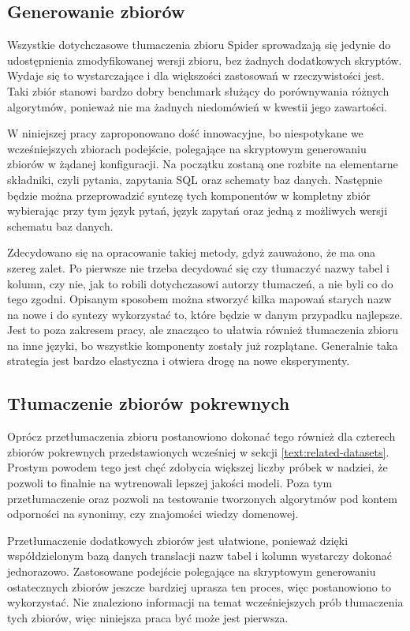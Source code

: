 \subsection{Generowanie zbiorów}
Wszystkie dotychczasowe tłumaczenia zbioru Spider sprowadzają się jedynie do udostępnienia zmodyfikowanej wersji zbioru, bez żadnych dodatkowych skryptów. Wydaje się to wystarczające i dla większości zastosowań w rzeczywistości jest. Taki zbiór stanowi bardzo dobry benchmark służący do porównywania różnych algorytmów, ponieważ nie ma żadnych niedomówień w kwestii jego zawartości.

W niniejszej pracy zaproponowano dość innowacyjne, bo niespotykane we wcześniejszych zbiorach podejście, polegające na skryptowym generowaniu zbiorów w żądanej konfiguracji. Na początku zostaną one rozbite na elementarne składniki, czyli pytania, zapytania SQL oraz schematy baz danych. Następnie będzie można przeprowadzić syntezę tych komponentów w kompletny zbiór wybierając przy tym język pytań, język zapytań oraz jedną z możliwych wersji schematu baz danych.

Zdecydowano się na opracowanie takiej metody, gdyż zauważono, że ma ona szereg zalet. Po pierwsze nie trzeba decydować się czy tłumaczyć nazwy tabel i kolumn, czy nie, jak to robili dotychczasowi autorzy tłumaczeń, a nie byli co do tego zgodni. Opisanym sposobem można stworzyć kilka mapowań starych nazw na nowe i do syntezy wykorzystać to, które będzie w danym przypadku najlepsze. Jest to poza zakresem pracy, ale znacząco to ułatwia również tłumaczenia zbioru na inne języki, bo wszystkie komponenty zostały już rozplątane. Generalnie taka strategia jest bardzo elastyczna i otwiera drogę na nowe eksperymenty.

\subsection{Tłumaczenie zbiorów pokrewnych}
Oprócz przetłumaczenia zbioru  postanowiono dokonać tego również dla czterech zbiorów pokrewnych przedstawionych wcześniej w sekcji \ref{text:related-datasets}. Prostym powodem tego jest chęć zdobycia większej liczby próbek w nadziei, że pozwoli to finalnie na wytrenowali lepszej jakości modeli. Poza tym przetłumaczenie  oraz  pozwoli na testowanie tworzonych algorytmów pod kontem odporności na synonimy, czy znajomości wiedzy domenowej. 

Przetłumaczenie dodatkowych zbiorów jest ułatwione, ponieważ dzięki współdzielonym bazą danych translacji nazw tabel i kolumn wystarczy dokonać jednorazowo. Zastosowane podejście polegające na skryptowym generowaniu ostatecznych zbiorów jeszcze bardziej uprasza ten proces, więc postanowiono to wykorzystać. Nie znaleziono informacji na temat wcześniejszych prób tłumaczenia tych zbiorów, więc niniejsza praca być może jest pierwsza.

